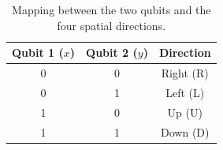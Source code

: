 \begin{table}[H]
\centering
\caption{Mapping between the two qubits and the four spatial directions.}
\label{tab:mapping}
\begin{tabular}{ccc}
\toprule
\textbf{Qubit 1 ($x$)} & \textbf{Qubit 2 ($y$)} & \textbf{Direction} \\
\midrule
0 & 0 & Right (R) \\
0 & 1 & Left (L) \\
1 & 0 & Up (U) \\
1 & 1 & Down (D) \\
\bottomrule
\end{tabular}
\end{table}
